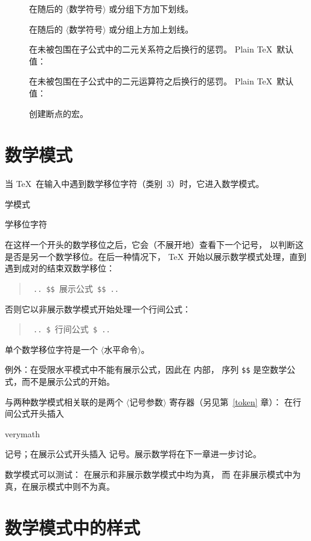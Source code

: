 \documentclass[a4paper]{rapport3}
\makeatletter
\def\gr#1{$\langle$#1$\rangle$}\def\key#1{{\tt#1}}
\newenvironment{disp}{\begin{quotation}}{\end{quotation}}
\newenvironment{inventory}{\begin{description}}{\end{description}}
\def\term#1\par{\index{#1}}
\def\cstoidx#1\par{\index{#1@\cs{#1}}}
\def\csidx#1{\cstoidx #1\par\cs{#1}}
\makeatother
\begin{document}
\begin{inventory}
\item [] 
      在随后的 \gr{数学符号} 或分组下方加下划线。

\item [] 
      在随后的 \gr{数学符号} 或分组上方加上划线。


\item [] 
      在未被包围在子公式中的二元关系符之后换行的惩罚。
      Plain \TeX\ 默认值：~

\item [] 
      在未被包围在子公式中的二元运算符之后换行的惩罚。
      Plain \TeX\ 默认值：~

\item [] 
      创建断点的宏。

\end{inventory}

\section{数学模式}
\label{math:modes}

当 \TeX\ 在输入中遇到数学移位字符（类别~3）时，它进入数学模式。
\term 数学模式\par\term 数学移位字符\par
在这样一个开头的数学移位之后，它会（不展开地）查看下一个记号，
以判断这是否是另一个数学移位。在后一种情况下，
\TeX\ 开始以展示数学模式处理，直到遇到成对的结束双数学移位：
\begin{disp}\verb> .. $$ >{\italic 展示公式}\verb> $$ ..>\end{disp}
否则它以非展示数学模式开始处理一个行间公式：
\begin{disp}\verb> .. $ >{\italic 行间公式}\verb> $ ..>\end{disp}
单个数学移位字符是一个 \gr{水平命令}。

例外：在受限水平模式中不能有展示公式，因此在  内部，
序列 \verb>$$> 是空数学公式，而不是展示公式的开始。

与两种数学模式相关联的是两个 \gr{记号参数} 寄存器（另见第~\ref{token} 章）：
在行间公式开头插入 \csidx{everymath} 记号；在展示公式开头插入
 记号。展示数学将在下一章进一步讨论。

数学模式可以测试： 在展示和非展示数学模式中均为真，
而  在非展示模式中为真，在展示模式中则不为真。

\section{数学模式中的样式}
\label{math:styles}
\end{document}
